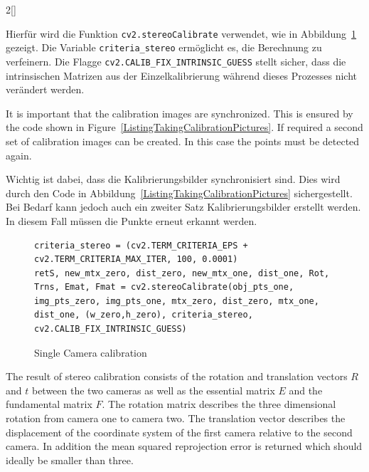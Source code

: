 \begin{paracol}{2}[]
\colger

Hierfür wird die Funktion \texttt{cv2.stereoCalibrate} verwendet, wie in Abbildung~\ref{ListingStereoCalibration} gezeigt. Die Variable \texttt{criteria\_stereo} ermöglicht es, die Berechnung zu verfeinern. Die Flagge \texttt{cv2.CALIB\_FIX\_INTRINSIC\_GUESS} stellt sicher, dass die intrinsischen Matrizen aus der Einzelkalibrierung während dieses Prozesses nicht verändert werden.

\coleng

It is important that the calibration images are synchronized. This is ensured by the code shown in Figure~\ref{ListingTakingCalibrationPictures}. If required a second set of calibration images can be created. In this case the points must be detected again.

\colger

Wichtig ist dabei, dass die Kalibrierungsbilder synchronisiert sind. Dies wird durch den Code in Abbildung~\ref{ListingTakingCalibrationPictures} sichergestellt. Bei Bedarf kann jedoch auch ein zweiter Satz Kalibrierungsbilder erstellt werden. In diesem Fall müssen die Punkte erneut erkannt werden.

\colende

\begin{figure}
	\begin{lstlisting}[style=shell]
criteria_stereo = (cv2.TERM_CRITERIA_EPS + cv2.TERM_CRITERIA_MAX_ITER, 100, 0.0001)
retS, new_mtx_zero, dist_zero, new_mtx_one, dist_one, Rot, Trns, Emat, Fmat = cv2.stereoCalibrate(obj_pts_one, img_pts_zero, img_pts_one, mtx_zero, dist_zero, mtx_one, dist_one, (w_zero,h_zero), criteria_stereo, cv2.CALIB_FIX_INTRINSIC_GUESS)
	\end{lstlisting}
	\caption{Single Camera calibration}
	\label{ListingStereoCalibration}
\end{figure}
\FloatBarrier

\colstart

The result of stereo calibration consists of the rotation and translation vectors $R$ and $t$ between the two cameras as well as the essential matrix $E$ and the fundamental matrix $F$. The rotation matrix describes the three dimensional rotation from camera one to camera two. The translation vector describes the displacement of the coordinate system of the first camera relative to the second camera. In addition the mean squared reprojection error is returned which should ideally be smaller than three.

\colger


\end{paracol}

